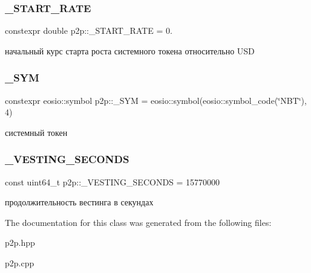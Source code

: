 \subsubsection{\texorpdfstring{\+\_\+\+S\+T\+A\+R\+T\+\_\+\+R\+A\+TE}{\_START\_RATE}}
{\footnotesize\ttfamily constexpr double p2p\+::\+\_\+\+S\+T\+A\+R\+T\+\_\+\+R\+A\+TE = 0.\hspace{0.3cm}{\ttfamily [static]}}

начальный курс старта роста системного токена относительно U\+SD \mbox{\label{classp2p_afe8d32633b8a87ce35209184d222f6de}} 
\subsubsection{\texorpdfstring{\+\_\+\+S\+YM}{\_SYM}}
{\footnotesize\ttfamily constexpr eosio\+::symbol p2p\+::\+\_\+\+S\+YM = eosio\+::symbol(eosio\+::symbol\+\_\+code(\char`\"{}N\+BT\char`\"{}), 4)\hspace{0.3cm}{\ttfamily [static]}}

системный токен \mbox{\label{classp2p_af52bcfc4c42cb8a001ab4935d06539c0}} 
\subsubsection{\texorpdfstring{\+\_\+\+V\+E\+S\+T\+I\+N\+G\+\_\+\+S\+E\+C\+O\+N\+DS}{\_VESTING\_SECONDS}}
{\footnotesize\ttfamily const uint64\+\_\+t p2p\+::\+\_\+\+V\+E\+S\+T\+I\+N\+G\+\_\+\+S\+E\+C\+O\+N\+DS = 15770000\hspace{0.3cm}{\ttfamily [static]}}

продолжительность вестинга в секундах 

The documentation for this class was generated from the following files\+:\begin{DoxyCompactItemize}
\item 
p2p.\+hpp\item 
p2p.\+cpp\end{DoxyCompactItemize}
